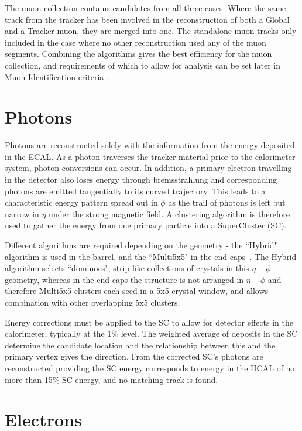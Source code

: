 The muon collection contains candidates from all three cases. Where the same track from the tracker has been involved in the reconstruction of both a Global and a Tracker muon, they are merged into one.  The standalone muon tracks only included in the case where no other reconstruction used any of the muon segments. Combining the algorithms gives the best efficiency for the muon collection, and requirements of which to allow for analysis can be set later in Muon Identification criteria~\cite{MUO-10-004}. 
\section{Photons}

Photons are reconstructed solely with the information from the energy deposited in the ECAL. As a photon traverses the tracker material prior to the calorimeter system, photon conversions can occur.  In addition, a primary electron travelling in the detector also loses energy through bremsstrahlung and corresponding photons are emitted tangentially to its curved trajectory. This leads to a characteristic energy pattern spread out in $\phi$ as the trail of photons is left but narrow in $\eta$ under the strong magnetic field. A clustering algorithm is therefore used to gather the energy from one primary particle into a SuperCluster (SC).

 Different algorithms are required depending on the geometry - the ``Hybrid" algorithm is used in the barrel, and the ``Multi5x5" in the end-caps~\cite{EGM-10-005}. The Hybrid algorithm selects ``dominoes", strip-like collections of crystals in this $\eta - \phi$ geometry, whereas in the end-caps the structure is not arranged in $\eta - \phi$ and therefore Multi5x5 clusters each seed in a 5x5 crystal window, and allows combination with other overlapping 5x5 clusters.

Energy corrections must be applied to the SC to allow for detector effects in the calorimeter, typically at the 1\% level. The weighted average of deposits in the SC determine the candidate location and the relationship between this and the primary vertex gives the direction. From the corrected SC's photons are reconstructed providing the SC energy corresponds to energy in the HCAL of no more than 15\% SC energy, and no matching track is found. 

\section{Electrons}


